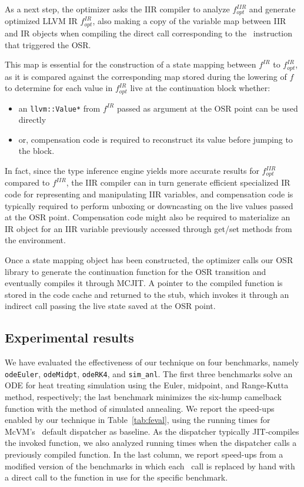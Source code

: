 As a next step, the optimizer asks the IIR compiler to analyze $f^{IIR}_{opt}$ and generate optimized LLVM IR $f^{IR}_{opt}$, also making a copy of the variable map between IIR and IR objects when compiling the direct call corresponding to the \feval\ instruction that triggered the OSR.

This map is essential for the construction of a state mapping between $f^{IR}$ to $f^{IR}_{opt}$, as it is compared against the corresponding map stored during the lowering of $f$ to determine for each value in $f^{IR}_{opt}$ live at the continuation block whether:
\begin{itemize}
\item an {\tt llvm::Value*} from $f^{IR}$ passed as argument at the OSR point can be used directly
\item or, compensation code is required to reconstruct its value before jumping to the block.
\end{itemize}

In fact, since the type inference engine yields more accurate results for $f^{IIR}_{opt}$ compared to $f^{IIR}$, the IIR compiler can in turn generate efficient specialized IR code for representing and manipulating IIR variables, and compensation code is typically required to perform unboxing or downcasting on the live values passed at the OSR point. Compensation code might also be required to materialize an IR object for an IIR variable previously accessed through get/set methods from the environment.

Once a state mapping object has been constructed, the optimizer calls our OSR library to generate the continuation function for the OSR transition and eventually compiles it through MCJIT. A pointer to the compiled function is stored in the code cache and returned to the stub, which invokes it through an indirect call passing the live state saved at the OSR point.

\subsection{Experimental results}
We have evaluated the effectiveness of our technique on four benchmarks, namely {\tt odeEuler}, {\tt odeMidpt}, {\tt odeRK4}, and {\tt sim\_anl}. The first three benchmarks solve an ODE for heat treating simulation using the Euler, midpoint, and Range-Kutta method, respectively; the last benchmark minimizes the six-hump camelback function with the method of simulated annealing. We report the speed-ups enabled by our technique in Table~\ref{tab:feval}, using the running times for McVM's \feval\ default dispatcher as baseline. As the dispatcher typically JIT-compiles the invoked function, we also analyzed running times when the dispatcher calls a previously compiled function. In the last column, we report speed-ups from a modified version of the benchmarks in which each \feval\ call is replaced by hand with a direct call to the function in use for the specific benchmark.
  
